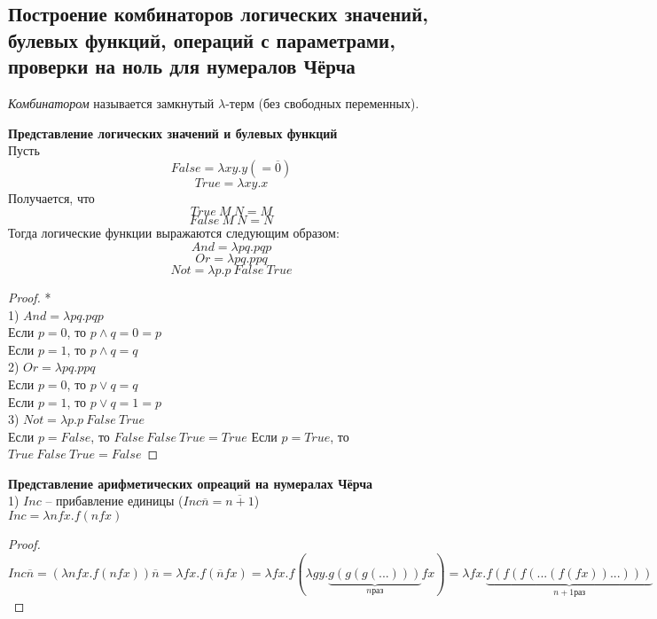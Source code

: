 \subsection{Построение комбинаторов логических значений, булевых функций, операций с параметрами, проверки на ноль для нумералов Чёрча}
    
\begin{definition}
    \textit{Комбинатором} называется замкнутый $\lambda$-терм (без свободных переменных).
\end{definition}

\textbf{Представление логических значений и булевых функций}\\

Пусть
$$
    False = \lambda xy.y (= \overline{0})
$$
$$
    True = \lambda xy.x
$$
Получается, что
$$
    True \: M \: N = M
$$
$$
    False \: M \: N = N
$$
Тогда логические функции выражаются следующим образом:
$$
    And = \lambda pq.pqp
$$
$$
    Or = \lambda pq.ppq
$$
$$
    Not = \lambda p.p \: False \: True
$$

\begin{proof}*\\
    1) $And = \lambda pq.pqp$\\
    Если $p = 0$, то $p \wedge q = 0 = p$\\
    Если $p = 1$, то $p \wedge q = q$\\
    2) $Or = \lambda pq.ppq$\\
    Если $p = 0$, то $p \lor q = q$\\
    Если $p = 1$, то $p \lor q = 1 = p$\\
    3) $Not = \lambda p.p \: False \: True$\\
    Если $p = False$, то $False \: False \: True = True$
    Если $p = True$, то $True \: False \: True = False$
\end{proof}


\textbf{Представление арифметических опреаций на нумералах Чёрча}\\

1) $Inc$ -- прибавление единицы ($Inc \overline{n} = \overline{n + 1}$)\\

$Inc = \lambda nfx.f(nfx)$\\

\begin{proof}
    $
        Inc \overline{n} = (\lambda nfx.f(nfx)) \overline{n} = \lambda fx. f(\overline{n}fx) = \lambda fx.f(\lambda gy.\underbrace{g(g(g(...)))}_{n \text{раз}} fx) = \lambda fx. \underbrace{f(f(f(...(f(fx))...)))}_{n + 1 \text{раз}} = \overline{n + 1}
    $
\end{proof}

